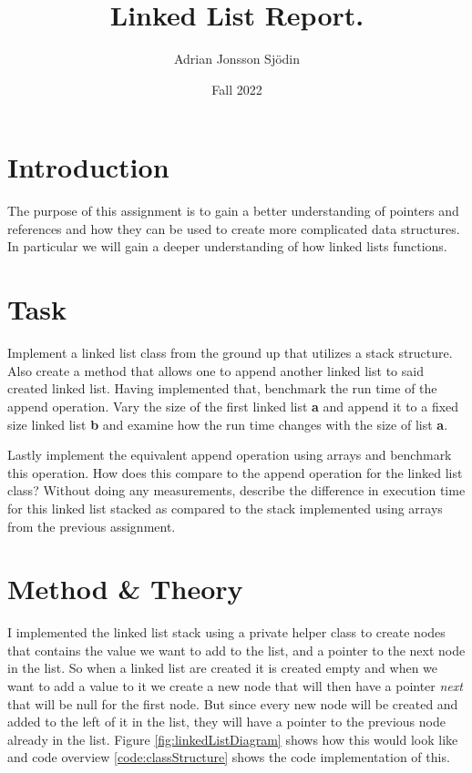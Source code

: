 \documentclass[a4paper,11pt]{article}
\begin{document}
\title{
    \textbf{Linked List Report.}
}
\author{Adrian Jonsson Sjödin}
\date{Fall 2022}

\maketitle

\section*{Introduction}
The purpose of this assignment is to gain a better understanding of pointers and references
and how they can be used to create more complicated data structures. In particular we will
gain a deeper understanding of how linked lists functions.

\section*{Task}
Implement a linked list class from the ground up that utilizes a stack structure. Also
create a method that allows one to append another linked list to said created linked list.
Having implemented that, benchmark the run time of the append operation. Vary the size of the
first linked list \textbf{a} and append it to a fixed size linked list \textbf{b} and
examine how the run time changes with the size of list \textbf{a}.

Lastly implement the equivalent append operation using arrays and benchmark this operation.
How does this compare to the append operation for the linked list class? Without doing any measurements,
describe the difference in execution time for this linked list stacked as compared to the stack implemented
using arrays from the previous assignment.

\section*{Method \& Theory}
I implemented the linked list stack using a private helper class to create nodes that contains the value
we want to add to the list, and a pointer to the next node in the list. So when a linked list are created
it is created empty and when we want to add a value to it we create a new node that will then have a pointer
\textit{next} that will be null for the first node. But since every new node will be created and added to the
left of it in the list, they will have a pointer to the previous node already in the list. Figure
\ref{fig:linkedListDiagram} shows how this would look like and code overview \ref{code:classStructure} shows the code implementation
of this.
\end{document}
